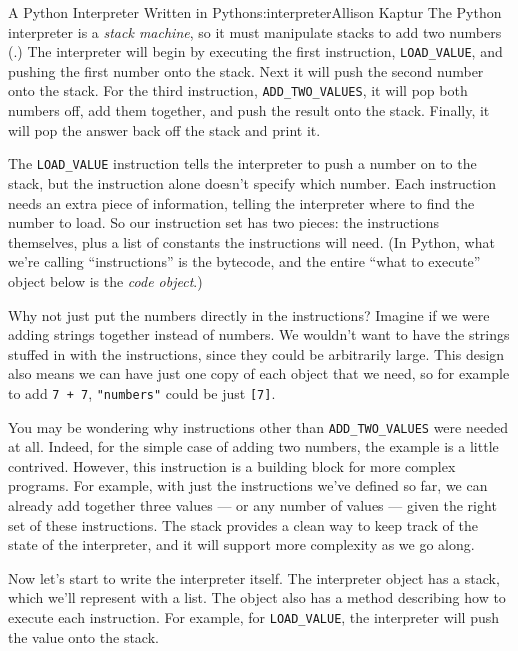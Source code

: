 \begin{aosachapter}{A Python Interpreter Written in Python}{s:interpreter}{Allison Kaptur}
The Python interpreter is a \emph{stack machine}, so it must manipulate
stacks to add two numbers (.)
The interpreter will begin by executing the first instruction,
\texttt{LOAD\_VALUE}, and pushing the first number onto the stack. Next
it will push the second number onto the stack. For the third
instruction, \texttt{ADD\_TWO\_VALUES}, it will pop both numbers off,
add them together, and push the result onto the stack. Finally, it will
pop the answer back off the stack and print it.


The \texttt{LOAD\_VALUE} instruction tells the interpreter to push a
number on to the stack, but the instruction alone doesn't specify which
number. Each instruction needs an extra piece of information, telling
the interpreter where to find the number to load. So our instruction set
has two pieces: the instructions themselves, plus a list of constants
the instructions will need. (In Python, what we're calling
``instructions'' is the bytecode, and the entire ``what to execute''
object below is the \emph{code object}.)

Why not just put the numbers directly in the instructions? Imagine if we
were adding strings together instead of numbers. We wouldn't want to
have the strings stuffed in with the instructions, since they could be
arbitrarily large. This design also means we can have just one copy of
each object that we need, so for example to add \texttt{7 + 7},
\texttt{"numbers"} could be just \texttt{{[}7{]}}.

You may be wondering why instructions other than
\texttt{ADD\_TWO\_VALUES} were needed at all. Indeed, for the simple
case of adding two numbers, the example is a little contrived. However,
this instruction is a building block for more complex programs. For
example, with just the instructions we've defined so far, we can already
add together three values --- or any number of values --- given the
right set of these instructions. The stack provides a clean way to keep
track of the state of the interpreter, and it will support more
complexity as we go along.

Now let's start to write the interpreter itself. The interpreter object
has a stack, which we'll represent with a list. The object also has a
method describing how to execute each instruction. For example, for
\texttt{LOAD\_VALUE}, the interpreter will push the value onto the
stack.


\end{aosachapter}
